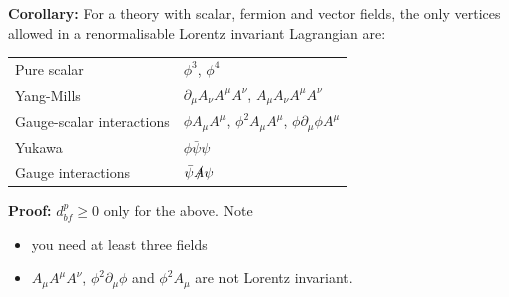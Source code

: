 \newline
\textbf{Corollary: } For a theory with scalar, fermion and vector fields, the only vertices allowed in a renormalisable Lorentz invariant Lagrangian are:
\begin{table}[h!]
\begin{tabular}{ll}
 Pure scalar & $\phi^3$, $\phi^4$  \\
 Yang-Mills &  $\partial_\mu A_\nu A^\mu A^\nu$, $A_\mu A_\nu A^\mu A^\nu$ \\
 Gauge-scalar interactions & $\phi A_\mu A^\mu$, $\phi^2 A_\mu A^\mu$, $\phi \partial_\mu \phi A^\mu$ \\
 Yukawa &  $\phi \bar{\psi} \psi$ \\
 Gauge interactions & $\bar{\psi} \slashed{A} \psi$
\end{tabular}
\end{table}
\newline
\textbf{Proof: } $d^p_{bf} \geq 0$ only for the above. Note
\begin{itemize}
\item you need at least three fields
\item $A_\mu A^\mu A^\nu$, $\phi^2 \partial_\mu \phi$ and $\phi^2 A_\mu$ are not Lorentz invariant.
\end{itemize}
%
